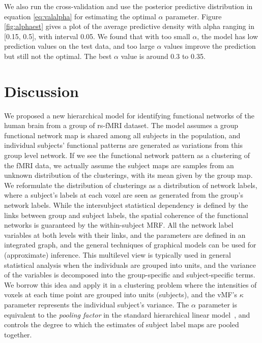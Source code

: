 \documentclass[review,authoryear]{elsarticle}
\begin{document}
We also run the cross-validation and use the posterior predictive distribution
in equation \eqref{eq:valalpha} for estimating the optimal $\alpha$
parameter. Figure \ref{fig:alphaest} gives a plot of the average predictive
density with alpha ranging in [0.15, 0.5], with interval 0.05. We found that with
too small $\alpha$, the model has low prediction values on the test data, and
too large $\alpha$ values improve the prediction but still not the optimal. The
best $\alpha$ value is around 0.3 to 0.35.

\section{Discussion}
\label{sec:discussion}
We proposed a new hierarchical model for identifying functional networks of the
human brain from a group of rs-fMRI dataset. The model assumes a group
functional network map is shared among all subjects in the population, and
individual subjects' functional patterns are generated as variations from this
group level network. If we see the functional network pattern as a clustering of
the fMRI data, we actually assume the subject maps are samples from an unknown
distribution of the clusterings, with its mean given by the group map. We
reformulate the distribution of clusterings as a distribution of network labels,
where a subject's labels at each voxel are seen as generated from the group's
network labels. While the intersubject statistical dependency is defined by the
links between group and subject labels, the spatial coherence of the functional
networks is guaranteed by the within-subject MRF. All the network label
variables at both levels with their links, and the parameters  are defined in an integrated graph, and
the general techniques of graphical models can be used for (approximate)
inference. This multilevel view is typically used in general statistical
analysis when the individuals are grouped into units, and the variance of the
variables is decomposed into the group-specific and subject-specific terms. We
borrow this idea and apply it in a clustering problem where the intensities of
voxels at each time point are grouped into units (subjects), and the vMF's
$\kappa$ parameter represents the individual subject's variance. The $\alpha$
parameter is equivalent to the \emph{pooling factor} in the standard
hierarchical linear model~\citep{gelman2006bayesian}, and controls the degree to
which the estimates of subject label maps are pooled together.
\end{document}
